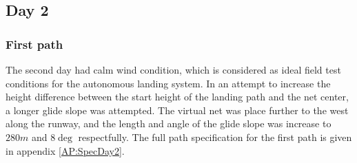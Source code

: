\subsection{Day 2}
\subsubsection{First path}
The second day had calm wind condition, which is considered as ideal field test conditions for the autonomous landing system. In an attempt to increase the height difference between the start height of the landing path and the net center, a longer glide slope was attempted. The virtual net was place further to the west along the runway, and the length and angle of the glide slope was increase to $280 m$ and $8 \deg$ respectfully. The full path specification for the first path is given in appendix \ref{AP:SpecDay2}.

